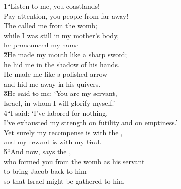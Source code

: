 \begin{poetry}
\poeml {}
\v{1}``Listen to me, you coastlands! \\
\poemll    Pay attention, you people from far away! \\
\poeml The  called me from the womb; \\
\poemll    while I was still in my mother's body, \\
\poemlll       he pronounced my name. \\
\poeml \v{2}He made my mouth like a sharp sword; \\
\poemll    he hid me in the shadow of his hands. \\
\poeml He made me like a polished arrow \\
\poemll    and hid me away in his quivers. \\
\poeml \v{3}He said to me: `You are my servant, \\
\poemll    Israel, in whom I will glorify myself.' \\
\poeml \v{4}``I said: `I've labored for nothing. \\
\poemll    I've exhausted my strength on futility and on emptiness.' \\
\poeml Yet surely my recompense is with the , \\
\poemll    and my reward is with my God. \\
\poeml \v{5}``And now, says the , \\
\poemll    who formed you from the womb as his servant \\
\poeml to bring Jacob back to him \\
\poemll    so that Israel might be gathered to him--- \\

\end{poetry}
